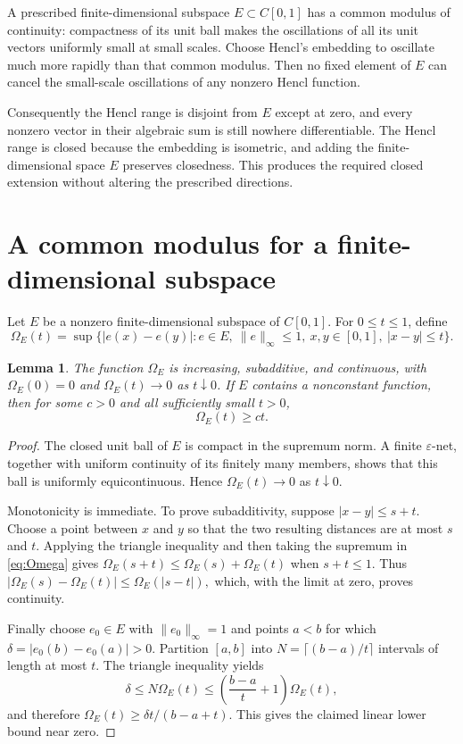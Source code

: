 \documentclass[11pt]{article}
\newtheorem{lemma}{Lemma}
\begin{document}
A prescribed finite-dimensional subspace $E\subset C[0,1]$ has a common
modulus of continuity: compactness of its unit ball makes the oscillations of
all its unit vectors uniformly small at small scales.  Choose Hencl's
embedding to oscillate much more rapidly than that common modulus.  Then no
fixed element of $E$ can cancel the small-scale oscillations of any nonzero
Hencl function.

Consequently the Hencl range is disjoint from $E$ except at zero, and every
nonzero vector in their algebraic sum is still nowhere differentiable.  The
Hencl range is closed because the embedding is isometric, and adding the
finite-dimensional space $E$ preserves closedness.  This produces the
required closed extension without altering the prescribed directions.

\section{A common modulus for a finite-dimensional subspace}

Let $E$ be a nonzero finite-dimensional subspace of $C[0,1]$.  For
$0\le t\le1$, define
\begin{equation}\label{eq:Omega}
 \Omega_E(t)=\sup\bigl\{|e(x)-e(y)|:
       e\in E,\ \|e\|_\infty\le1,\ x,y\in[0,1],\ |x-y|\le t\bigr\}.
\end{equation}

\begin{lemma}\label{lem:modulus}
The function $\Omega_E$ is increasing, subadditive, and continuous, with
$\Omega_E(0)=0$ and $\Omega_E(t)\to0$ as $t\downarrow0$.  If $E$ contains a
nonconstant function, then for some $c>0$ and all sufficiently small $t>0$,
\[
                         \Omega_E(t)\ge ct.
\]
\end{lemma}

\begin{proof}
The closed unit ball of $E$ is compact in the supremum norm.  A finite
$\varepsilon$-net, together with uniform continuity of its finitely many
members, shows that this ball is uniformly equicontinuous.  Hence
$\Omega_E(t)\to0$ as $t\downarrow0$.

Monotonicity is immediate.  To prove subadditivity, suppose
$|x-y|\le s+t$.  Choose a point between $x$ and $y$ so that the two resulting
distances are at most $s$ and $t$.  Applying the triangle inequality and then
taking the supremum in \eqref{eq:Omega} gives
\(
 \Omega_E(s+t)\le\Omega_E(s)+\Omega_E(t)
\)
when $s+t\le1$.  Thus
\(
 |\Omega_E(s)-\Omega_E(t)|\le\Omega_E(|s-t|),
\)
which, with the limit at zero, proves continuity.

Finally choose $e_0\in E$ with $\|e_0\|_\infty=1$ and points $a<b$ for which
$\delta=|e_0(b)-e_0(a)|>0$.  Partition $[a,b]$ into
$N=\lceil(b-a)/t\rceil$ intervals of length at most $t$.  The triangle
inequality yields
\[
 \delta\le N\Omega_E(t)\le\left(\frac{b-a}{t}+1\right)\Omega_E(t),
\]
and therefore
\(
 \Omega_E(t)\ge \delta t/(b-a+t).
\)
This gives the claimed linear lower bound near zero.
\end{proof}
\end{document}
